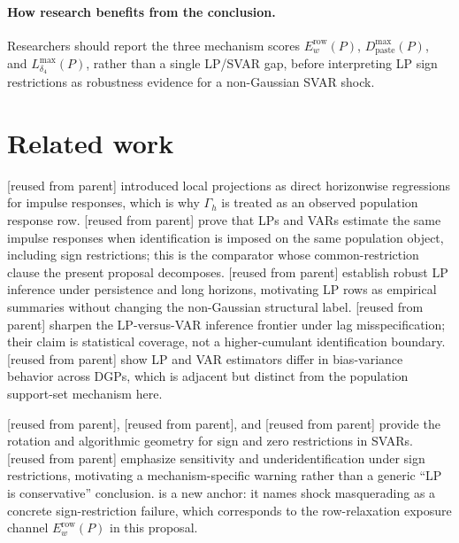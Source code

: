 \documentclass[11pt]{article}
\theoremstyle{definition}
\theoremstyle{plain}
\theoremstyle{remark}
\begin{document}
\paragraph{How research benefits from the conclusion.}
Researchers should report the three mechanism scores \(E_w^{\mathrm{row}}(P)\), \(D_{\mathrm{paste}}^{\max}(P)\), and \(L_{\delta_4}^{\max}(P)\), rather than a single LP/SVAR gap, before interpreting LP sign restrictions as robustness evidence for a non-Gaussian SVAR shock.

\section{Related work}
\citet{Jorda2005} [reused from parent] introduced local projections as direct horizonwise regressions for impulse responses, which is why \(\Gamma_h\) is treated as an observed population response row.  \citet{PlagborgMollerWolf2021} [reused from parent] prove that LPs and VARs estimate the same impulse responses when identification is imposed on the same population object, including sign restrictions; this is the comparator whose common-restriction clause the present proposal decomposes.  \citet{MontielOleaPlagborgMoller2021} [reused from parent] establish robust LP inference under persistence and long horizons, motivating LP rows as empirical summaries without changing the non-Gaussian structural label.  \citet{MontielOleaPlagborgMollerQianWolf2024} [reused from parent] sharpen the LP-versus-VAR inference frontier under lag misspecification; their claim is statistical coverage, not a higher-cumulant identification boundary.  \citet{LiPlagborgMollerWolf2024} [reused from parent] show LP and VAR estimators differ in bias-variance behavior across DGPs, which is adjacent but distinct from the population support-set mechanism here.

\citet{RubioRamirezWaggonerZha2010} [reused from parent], \citet{AriasRubioRamirezWaggoner2018} [reused from parent], and \citet{Read2022} [reused from parent] provide the rotation and algorithmic geometry for sign and zero restrictions in SVARs.  \citet{BaumeisterHamilton2015} [reused from parent] emphasize sensitivity and underidentification under sign restrictions, motivating a mechanism-specific warning rather than a generic ``LP is conservative'' conclusion.  \citet{Wolf2022} is a new anchor: it names shock masquerading as a concrete sign-restriction failure, which corresponds to the row-relaxation exposure channel \(E_w^{\mathrm{row}}(P)\) in this proposal.
\end{document}
